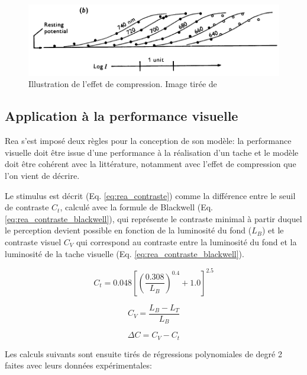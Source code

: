 	\begin{figure}
		\centering
		\includegraphics[scale=.6]{Figures/CompressionEffect}
		\caption{Illustration de l'effet de compression. Image tirée de \citep{naka_attempt_1966}}
		\label{fig:compression_effect}
	\end{figure} 
	
	\subsection{Application à la performance visuelle}
	\par Rea s'est imposé deux règles pour la conception de son modèle: la performance visuelle doit être issue d'une performance à la réalisation d'un tache et le modèle doit être cohérent avec la littérature, notamment avec l'effet de compression que l'on vient de décrire.
	
	\par Le stimulus est décrit (Eq. \ref{eq:rea_contraste}) comme la différence entre le seuil de contraste $C_t$, calculé avec la formule de Blackwell (Eq. \ref{eq:rea_contraste_blackwell}), qui représente le contraste minimal à partir duquel le perception devient possible en fonction de la luminosité du fond ($L_B$) et le contraste visuel $C_V$ qui correspond au contraste entre la luminosité du fond et la luminosité de la tache visuelle (Eq. \ref{eq:rea_contraste_blackwell}).
	
	\begin{equation}
		C_t = 0.048\left[\left(\frac{0.308}{L_B}\right)^{0.4} + 1.0\right]^{2.5}
		\label{eq:rea_contraste_blackwell}
	\end{equation}
	
	\begin{equation}
		C_V = \frac{L_B - L_T}{L_B}
		\label{eq:rea_contraste_visuel}
	\end{equation}
	
	\begin{equation}
		\Delta C = C_V - C_t
		\label{eq:rea_contraste}
	\end{equation}
	
	\par Les calculs suivants sont ensuite tirés de régressions polynomiales de degré 2 faites avec leurs données expérimentales:
	
